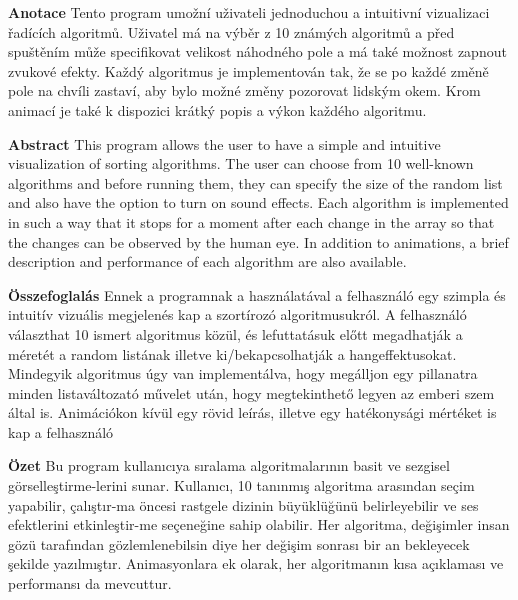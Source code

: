 \documentclass{article}
\begin{document}
\textbf{{\Large Anotace}} \linebreak
Tento program umožní uživateli jednoduchou a intuitivní vizualizaci řadících algoritmů. Uživatel má na výběr z  10 známých algoritmů a před spuštěním může specifikovat velikost náhodného pole a má také možnost zapnout zvukové efekty. Každý algoritmus je implementován tak, že se po každé změně pole na chvíli zastaví, aby bylo možné změny pozorovat lidským okem. Krom animací je také k dispozici krátký popis a výkon každého algoritmu.

\vspace{1cm}
\textbf{{\Large Abstract}}\linebreak
This program allows the user to have a simple and intuitive visualization of sorting algorithms. The user can choose from 10 well-known algorithms and before running them, they can specify the size of the random list and also have the option to turn on sound effects. Each algorithm is implemented in such a way that it stops for a moment after each change in the array so that the changes can be observed by the human eye. In addition to animations, a brief description and performance of each algorithm are also available.

\vspace{1cm}
\textbf{{\Large Összefoglalás}}\linebreak
Ennek a programnak a használatával a felhasználó egy szimpla és intuitív vizuális megjelenés kap a szortírozó algoritmusukról. A felhasználó választhat 10 ismert algoritmus közül, és lefuttatásuk előtt megadhatják a méretét a random listának illetve ki/bekapcsolhatják a hangeffektusokat. Mindegyik algoritmus úgy van implementálva, hogy megálljon egy pillanatra minden listaváltozató művelet után, hogy megtekinthető legyen az emberi szem által is. Animációkon kívül egy rövid leírás, illetve egy hatékonysági mértéket is kap a felhasználó

\vspace{1cm}
\textbf{{\Large Özet}}\linebreak
Bu program kullanıcıya sıralama algoritmalarının basit ve sezgisel görselleştirme-lerini sunar. Kullanıcı, 10 tanınmış algoritma arasından seçim yapabilir, çalıştır-ma öncesi rastgele dizinin büyüklüğünü belirleyebilir ve ses efektlerini etkinleştir-me seçeneğine sahip olabilir. Her algoritma, değişimler insan gözü tarafından gözlemlenebilsin diye her değişim sonrası bir an bekleyecek şekilde yazılmıştır. Animasyonlara ek olarak, her algoritmanın kısa açıklaması ve performansı da mevcuttur.
\end{document}
